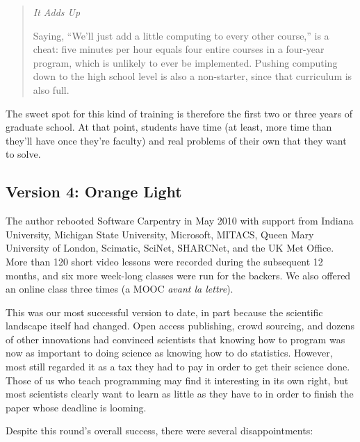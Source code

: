 \documentclass{article}
\begin{document}
\begin{quote}
\emph{It Adds Up}

Saying, ``We'll just add a little computing to every other course,'' is
a cheat: five minutes per hour equals four entire courses in a four-year
program, which is unlikely to ever be implemented. Pushing computing
down to the high school level is also a non-starter, since that
curriculum is also full.
\end{quote}

The sweet spot for this kind of training is therefore the first two or
three years of graduate school. At that point, students have time (at
least, more time than they'll have once they're faculty) and real
problems of their own that they want to solve.

\subsection{Version 4: Orange Light}

The author rebooted Software Carpentry in May 2010 with support from
Indiana University, Michigan State University, Microsoft, MITACS, Queen
Mary University of London, Scimatic, SciNet, SHARCNet, and the UK Met
Office. More than 120 short video lessons were recorded during the
subsequent 12 months, and six more week-long classes were run for the
backers. We also offered an online class three times (a MOOC \emph{avant
la lettre}).

This was our most successful version to date, in part because the
scientific landscape itself had changed. Open access publishing, crowd
sourcing, and dozens of other innovations had convinced scientists that
knowing how to program was now as important to doing science as knowing
how to do statistics. However, most still regarded it as a tax they had
to pay in order to get their science done. Those of us who teach
programming may find it interesting in its own right, but most
scientists clearly want to learn as little as they have to in order to
finish the paper whose deadline is looming.

Despite this round's overall success, there were several
disappointments:
\end{document}
